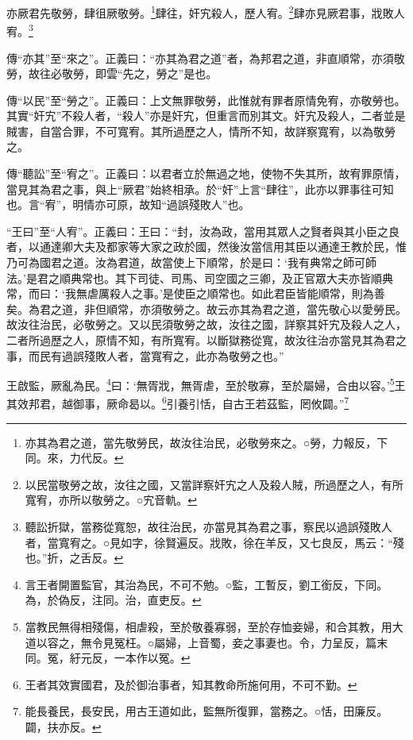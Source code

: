 亦厥君先敬勞，肆徂厥敬勞。\footnote{亦其為君之道，當先敬勞民，故汝往治民，必敬勞來之。○勞，力報反，下同。來，力代反。}肆往，奸宄殺人，歷人宥。\footnote{以民當敬勞之故，汝往之國，又當詳察奸宄之人及殺人賊，所過歷之人，有所寬宥，亦所以敬勞之。○宄音軌。}肆亦見厥君事，戕敗人宥。\footnote{聽訟折獄，當務從寬恕，故往治民，亦當見其為君之事，察民以過誤殘敗人者，當寬宥之。○見如字，徐賢遍反。戕敗，徐在羊反，又七良反，馬云：“殘也。”折，之舌反。}

{\noindent\zhuan{}\fzbyks 傳“亦其”至“來之”。正義曰：“亦其為君之道”者，為邦君之道，非直順常，亦須敬勞，故往必敬勞，即雲“先之，勞之”是也。 \par}

{\noindent\zhuan{}\fzbyks 傳“以民”至“勞之”。正義曰：上文無罪敬勞，此惟就有罪者原情免宥，亦敬勞也。其實“奸宄”不殺人者，“殺人”亦是奸宄，但重言而別其文。奸宄及殺人，二者並是賊害，自當合罪，不可寬宥。其所過歷之人，情所不知，故詳察寬宥，以為敬勞之。 \par}

{\noindent\zhuan{}\fzbyks 傳“聽訟”至“宥之”。正義曰：以君者立於無過之地，使物不失其所，故宥罪原情，當見其為君之事，與上“厥君”始終相承。於“奸”上言“肆往”，此亦以罪事往可知也。言“宥”，明情亦可原，故知“過誤殘敗人”也。 \par}

{\noindent\shu{}\fzkt “王曰”至“人宥”。正義曰：王曰：“封，汝為政，當用其眾人之賢者與其小臣之良者，以通達卿大夫及都家等大家之政於國，然後汝當信用其臣以通達王教於民，惟乃可為國君之道。汝為君道，故當使上下順常，於是曰：‘我有典常之師可師法。’是君之順典常也。其下司徒、司馬、司空國之三卿，及正官眾大夫亦皆順典常，而曰：‘我無虐厲殺人之事。’是使臣之順常也。如此君臣皆能順常，則為善矣。為君之道，非但順常，亦須敬勞之。故云亦其為君之道，當先敬心以愛勞民。故汝往治民，必敬勞之。又以民須敬勞之故，汝往之國，詳察其奸宄及殺人之人，二者所過歷之人，原情不知，有所寬宥。以斷獄務從寬，故汝往治亦當見其為君之事，而民有過誤殘敗人者，當寬宥之，此亦為敬勞之也。” \par}

王啟監，厥亂為民。\footnote{言王者開置監官，其治為民，不可不勉。○監，工暫反，劉工銜反，下同。為，於偽反，注同。治，直吏反。}曰：‘無胥戕，無胥虐，至於敬寡，至於屬婦，合由以容。’\footnote{當教民無得相殘傷，相虐殺，至於敬養寡弱，至於存恤妾婦，和合其教，用大道以容之，無令見冤枉。○屬婦，上音蜀，妾之事妻也。令，力呈反，篇末同。冤，紆元反，一本作以冤。}王其效邦君，越御事，厥命曷以。\footnote{王者其效實國君，及於御治事者，知其教命所施何用，不可不勤。}引養引恬，自古王若茲監，罔攸闢。”\footnote{能長養民，長安民，用古王道如此，監無所復罪，當務之。○恬，田廉反。闢，扶亦反。}

